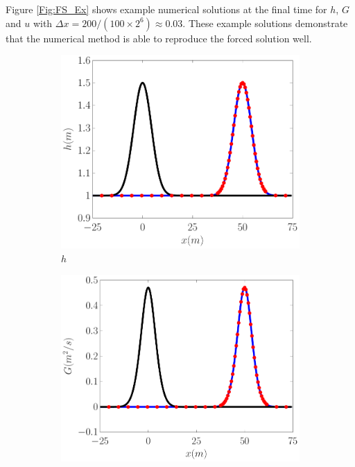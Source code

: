 \documentclass[10pt]{elsarticle}
\begin{document}
Figure \ref{Fig:FS_Ex} shows example numerical solutions at the final time for $h$, $G$ and $u$ with $\Delta x = 200 / (100 \times 2^{6}) \approx 0.03$. These example solutions demonstrate that the numerical method is able to reproduce the forced solution well.
%
\begin{figure}
	\centering
	\begin{subfigure}{0.32\textwidth}
		\centering
		\includegraphics[width=\textwidth]{./Figures/Simulations/Validation/Forced/iSGN/h.pdf}
		\caption{$h$}
	\end{subfigure}
	\begin{subfigure}{0.32\textwidth}
		\centering
		\includegraphics[width=\textwidth]{./Figures/Simulations/Validation/Forced/iSGN//G.pdf}

\end{subfigure}
\end{figure}
\end{document}
